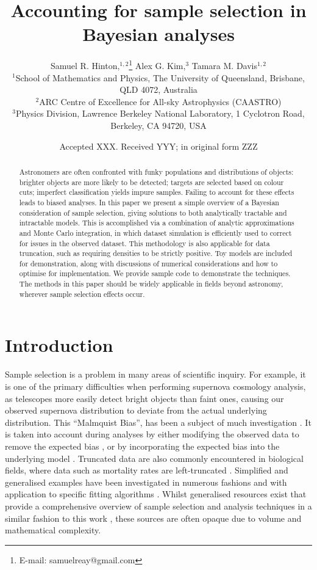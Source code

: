 \documentclass[a4paper,fleqn,usenatbib]{mnras}
\title[Accounting for sample selection in Bayesian analyses]{Accounting for sample selection in Bayesian analyses}
\author[S. R. Hinton et al.]{Samuel R. Hinton,$^{1,2}$\thanks{E-mail: samuelreay@gmail.com}
	Alex G. Kim,$^{3}$
	Tamara M. Davis$^{1,2}$
\\
$^{1}$School of Mathematics and Physics, The University of Queensland, Brisbane, QLD 4072, Australia\\
$^{2}$ARC Centre of Excellence for All-sky Astrophysics (CAASTRO)\\
$^{3}$Physics Division, Lawrence Berkeley National Laboratory, 1 Cyclotron Road, Berkeley, CA 94720, USA
}
\date{Accepted XXX. Received YYY; in original form ZZZ}
\begin{document}


\label{firstpage}
\pagerange{\pageref{firstpage}--\pageref{lastpage}}
\maketitle





\begin{abstract}
Astronomers are often confronted with funky populations and distributions of objects: brighter objects are more likely to be detected; targets are selected based on colour cuts; imperfect classification yields impure samples. Failing to account for these effects leads to biased analyses. In this paper we present a simple overview of a Bayesian consideration of sample selection, giving solutions to both analytically tractable and intractable models. This is accomplished via a combination of analytic approximations and Monte Carlo integration, in which dataset simulation is efficiently used to correct for issues in the observed dataset. This methodology is also applicable for data truncation, such as requiring densities to be strictly positive. Toy models are included for demonstration, along with discussions of numerical considerations and how to optimise for implementation.  We provide sample code to demonstrate the techniques.  The methods in this paper should be widely applicable in fields beyond astronomy, wherever sample selection effects occur.
\end{abstract}



\nokeywords




\section{Introduction}

Sample selection is a problem in many areas of scientific inquiry. For example, it is one of the primary difficulties when performing supernova cosmology analysis, as telescopes more easily detect bright objects than faint ones, causing our observed supernova distribution to deviate from the actual underlying distribution. This  ``Malmquist Bias'', has been a subject of much investigation \citep{Butkevich2005}. It is taken into account during analyses by either modifying the observed data to remove the expected bias \citep{BetouleKessler2014, ConleyGuySullivan2011}, or by incorporating the expected bias into the underlying model \citep{Rubin2015}. Truncated data are also commonly encountered in biological fields, where data such as mortality rates are left-truncated \citep{JANE1898}. Simplified and generalised examples have been investigated in numerous fashions \citep{woodroofe1985estimating, Gull1989bayesian, grogger1991models, o1995truncated} and with application to specific fitting algorithms \citep{Gelfand1992}. Whilst generalised resources exist that provide a comprehensive overview of sample selection and analysis techniques in a similar fashion to this work \citep{klein2005survival}, these sources are often opaque due to volume and mathematical complexity. 
\end{document}

